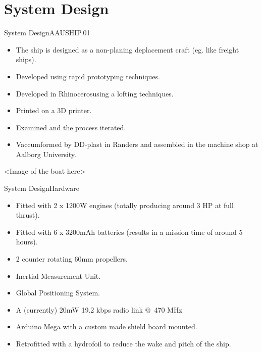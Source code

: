 \documentclass[10pt,handout]{beamer}
\begin{document}
\section{System Design}
\begin{frame}{System Design}{AAUSHIP.01}
\begin{itemize}
  \item<1-> The ship is designed as a non-planing deplacement craft (eg. like freight ships).
  \item<2-> Developed using rapid prototyping techniques.
  \item<3-> Developed in Rhinoceros\texttrademark using a lofting techniques.
  \item<4-> Printed on a 3D printer.
  \item<5-> Examined and the process iterated.
  \item<6-> Vaccumformed by DD-plast in Randers and assembled in the machine shop at Aalborg University.
\end{itemize}
<Image of the boat here>
\end{frame}

\begin{frame}{System Design}{Hardware}
\begin{itemize}
  \item Fitted with 2 x 1200W engines (totally producing around 3 HP at full thrust).
  \item Fitted with 6 x 3200mAh batteries (results in a mission time of around 5 hours).
  \item 2 counter rotating 60mm propellers.
  \item Inertial Measurement Unit.
  \item Global Positioning System.
  \item A (currently) 20mW 19.2 kbps radio link @ 470 MHz
  \item Arduino Mega with a custom made shield board mounted.
  \item Retrofitted with a hydrofoil to reduce the wake and pitch of the ship.
\end{itemize}
\end{frame}
\end{document}
